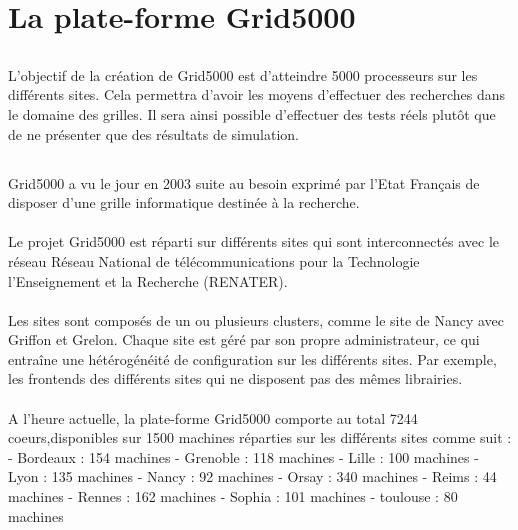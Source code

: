 \documentclass[a4paper, 10pt, onecolumn]{report}
\begin{document}
\chapter{La plate-forme Grid5000}
\section{}
L’objectif de la création de Grid5000 est d’atteindre 5000 processeurs sur les différents sites. Cela permettra d’avoir les moyens d’effectuer 
des recherches dans le domaine des grilles. Il sera ainsi possible d’effectuer des tests réels plutôt que de ne présenter que des résultats 
de simulation.

\section{}
Grid5000 a vu le jour en 2003 suite au besoin exprimé par l’Etat Français de disposer d'une
grille informatique destinée à la recherche.\\
\\
Le projet Grid5000 est réparti sur différents sites qui sont interconnectés avec le réseau
Réseau National de télécommunications pour la Technologie l’Enseignement et la Recherche
(RENATER).\\
\\
Les sites sont composés de un ou plusieurs clusters, comme le site de Nancy avec Griffon et
Grelon. Chaque site est géré par son propre administrateur, ce qui entraîne une hétérogénéité
de configuration sur les différents sites. Par exemple, les frontends des différents sites qui ne
disposent pas des mêmes librairies.\\
\\
A l’heure actuelle, la plate-forme Grid5000 comporte au total 7244 coeurs,disponibles sur 1500
machines réparties sur les différents sites comme suit :
- Bordeaux : 154 machines
- Grenoble : 118 machines
- Lille : 100 machines
- Lyon : 135 machines
- Nancy : 92 machines
- Orsay : 340 machines
- Reims : 44 machines
- Rennes : 162 machines
- Sophia : 101 machines
- toulouse : 80 machines


\section{}
\end{document}
